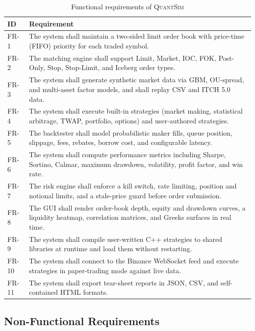 \documentclass[12pt,oneside,a4paper]{report}
\newcommand{\quantsim}{\textsc{QuantSim}}
\begin{document}
\begin{table}[H]
\centering
\caption{Functional requirements of \quantsim{}}
\label{tab:funcreq}
\small
\begin{tabular}{p{0.5in}p{4.5in}}
\toprule
\textbf{ID} & \textbf{Requirement} \\
\midrule
FR-1 & The system shall maintain a two-sided limit order book with price-time (FIFO) priority for each traded symbol. \\
FR-2 & The matching engine shall support Limit, Market, IOC, FOK, Post-Only, Stop, Stop-Limit, and Iceberg order types. \\
FR-3 & The system shall generate synthetic market data via GBM, OU-spread, and multi-asset factor models, and shall replay CSV and ITCH 5.0 data. \\
FR-4 & The system shall execute built-in strategies (market making, statistical arbitrage, TWAP, portfolio, options) and user-authored strategies. \\
FR-5 & The backtester shall model probabilistic maker fills, queue position, slippage, fees, rebates, borrow cost, and configurable latency. \\
FR-6 & The system shall compute performance metrics including Sharpe, Sortino, Calmar, maximum drawdown, volatility, profit factor, and win rate. \\
FR-7 & The risk engine shall enforce a kill switch, rate limiting, position and notional limits, and a stale-price guard before order submission. \\
FR-8 & The GUI shall render order-book depth, equity and drawdown curves, a liquidity heatmap, correlation matrices, and Greeks surfaces in real time. \\
FR-9 & The system shall compile user-written C++ strategies to shared libraries at runtime and load them without restarting. \\
FR-10 & The system shall connect to the Binance WebSocket feed and execute strategies in paper-trading mode against live data. \\
FR-11 & The system shall export tear-sheet reports in JSON, CSV, and self-contained HTML formats. \\
\bottomrule
\end{tabular}
\end{table}

\subsection{Non-Functional Requirements}
\end{document}
